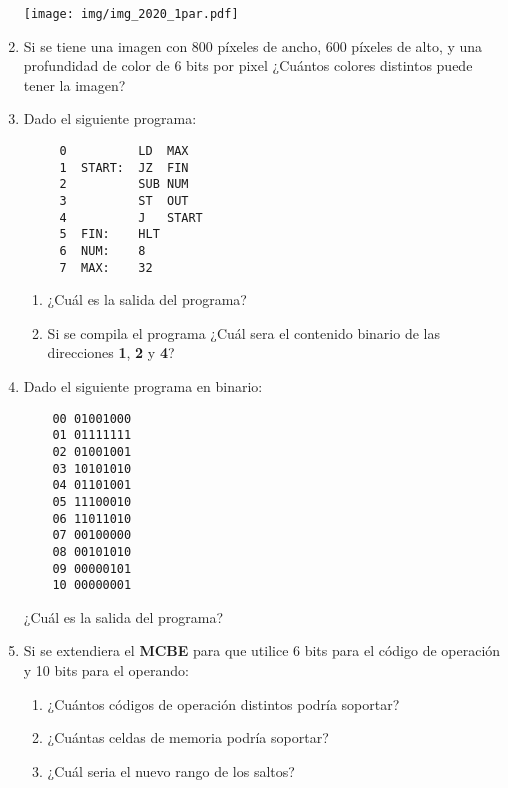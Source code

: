 \documentclass[12pt]{article}
\begin{document}
\begin{enumerate}
    \texttt{[image: img/img\_2020\_1par.pdf]}

    \item Si se tiene una imagen con 800 píxeles de ancho, 600 píxeles de
        alto, y una profundidad de color de 6 bits por pixel ¿Cuántos colores
        distintos puede tener la imagen?

    \item Dado el siguiente programa:

        \begin{verbatim}
     0          LD  MAX
     1  START:  JZ  FIN
     2          SUB NUM
     3          ST  OUT
     4          J   START
     5  FIN:    HLT
     6  NUM:    8
     7  MAX:    32
        \end{verbatim}

        \begin{enumerate}

            \item ¿Cuál es la salida del programa?

            \item Si se compila el programa ¿Cuál sera el contenido binario de
                las direcciones \textbf{1}, \textbf{2} y \textbf{4}?

        \end{enumerate}

    \item Dado el siguiente programa en binario:

        \begin{verbatim}
    00 01001000
    01 01111111
    02 01001001
    03 10101010
    04 01101001
    05 11100010
    06 11011010
    07 00100000
    08 00101010
    09 00000101
    10 00000001
        \end{verbatim}

        ¿Cuál es la salida del programa?

    \item Si se extendiera el \textbf{MCBE} para que utilice 6 bits para el
        código de operación y 10 bits para el operando:

        \begin{enumerate}

            \item ¿Cuántos códigos de operación distintos podría soportar?

            \item ¿Cuántas celdas de memoria podría soportar?

            \item ¿Cuál seria el nuevo rango de los saltos?


\end{enumerate}
\end{enumerate}
\end{document}
